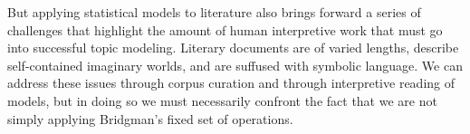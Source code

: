 But applying statistical models to literature also brings forward a series of challenges that highlight the amount of human interpretive work that must go into successful topic modeling.
Literary documents are of varied lengths, describe self-contained imaginary worlds, and are suffused with symbolic language.
We can address these issues through corpus curation and through interpretive reading of models, but in doing so we must necessarily confront the fact that we are not simply applying Bridgman's fixed set of operations.




























